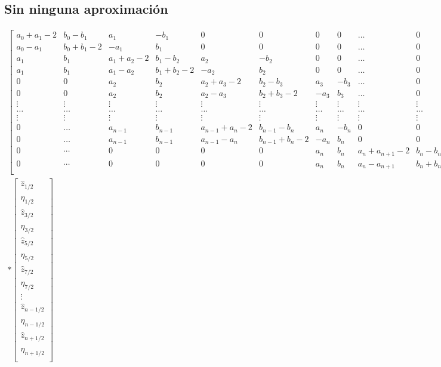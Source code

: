 \documentclass[]{article}%
\newcommand{\hz}{\hat{z}}
\newcommand{\heta}{\hat{\eta}}
\begin{document}
\subsection*{Sin ninguna aproximación}
\begin{equation}
\begin{split}
\begin{bmatrix}
a_0+a_1-2 &b_0-b_1 &a_1 &-b_1 & 0&0 &0 &0&\dots &0  \\
a_0-a_1 &b_0+b_1-2 &-a_1 &b_1&0 &0 &0&0& \dots &0  \\
a_1&b_1&a_1+a_2-2& b_1-b_2& a_2 & -b_2&0&0&\dots &0 \\
a_1&b_1&a_1-a_2& b_1+b_2-2&-a_2 &b_2&0&0&\dots &0 \\
0&0&a_2&b_2&a_2+a_3-2& b_2-b_3& a_3 & -b_3&\dots &0 \\
0&0&a_2&b_2&a_2-a_3& b_2+b_3-2&-a_3 &b_3&\dots &0 \\
\vdots  & \vdots &\vdots &\vdots &\vdots &\vdots & \vdots &\vdots &\vdots &\vdots  \\
\dots  & \dots &\dots &\dots &\dots &\dots & \dots &\dots &\dots &\dots  \\
\vdots  & \vdots &\vdots &\vdots &\vdots &\vdots & \vdots &\vdots &\vdots &\vdots  \\
0&\dots  &a_{n-1}&b_{n-1}&a_{n-1}+a_n-2& b_{n-1}-b_n& a_n & -b_n & 0 & 0 \\
0&\dots  &a_{n-1}&b_{n-1}&a_{n-1}-a_n& b_{n-1}+b_n-2&-a_n &b_n & 0 & 0 \\
0  & \cdots &0 &0 &0 &0 & a_n & b_n  & a_n+a_{n+1}-2 &b_n-b_{n+1}  \\
0  & \cdots &0 &0 &0 &0 & a_n & b_n  & a_n-a_{n+1} &b_n+b_{n+1}-2  \\
\end{bmatrix} \\
\ast \begin{bmatrix}
\hz_{1/2} \\ \heta_{1/2} \\
\hz_{3/2} \\ \heta_{3/2} \\
\hz_{5/2} \\ \heta_{5/2} \\
\hz_{7/2} \\ \heta_{7/2} \\
\vdots \\ %
\hz_{n-1/2} \\ \heta_{n-1/2} \\
\hz_{n+1/2} \\ \heta_{n+1/2} \\

\end{bmatrix}
\end{split}
\end{equation}
\end{document}
